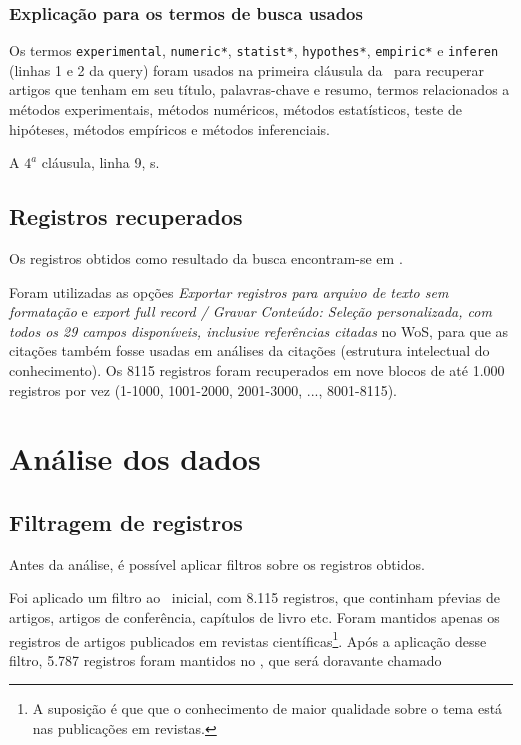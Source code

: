 \subsubsection{Explicação para os termos de busca usados\label{}}


Os termos \texttt{experimental}, \texttt{numeric*}, \texttt{statist*}, \texttt{hypothes*}, 
\texttt{empiric*}
e \texttt{inferen} (linhas 1 e 2 da query) foram usados na primeira cláusula da \query\  para recuperar artigos que tenham em seu título, palavras-chave e resumo, termos relacionados a métodos experimentais,
métodos numéricos,
métodos estatísticos,
teste de hipóteses,
métodos empíricos e métodos inferenciais.


A $4^{a}$ cláusula, linha 9,  s.

\subsection{Registros recuperados}

Os  registros obtidos como resultado da busca encontram-se em \url{}. 

Foram utilizadas as opções \textit{Exportar registros para arquivo de texto sem formatação} e \textit{export full record / Gravar Conteúdo: Seleção personalizada, com todos os 29 campos disponíveis, inclusive referências citadas} no WoS, para que as citações também fosse usadas em análises da citações (estrutura intelectual do conhecimento). Os 8115 registros foram recuperados em nove blocos de até 1.000 registros por vez (1-1000, 1001-2000, 2001-3000, ..., 8001-8115).


\section{Análise dos dados}

\subsection{Filtragem de registros}
Antes da análise, é possível aplicar filtros sobre os registros obtidos.

Foi aplicado um filtro ao \dataset\   inicial, com 8.115 registros, que continham pŕevias de artigos, artigos de conferência, capítulos de livro etc. Foram mantidos apenas os registros de artigos publicados em revistas científicas\footnote{A suposição é que que o conhecimento de maior qualidade sobre o tema está nas publicações em revistas.}. Após a aplicação desse filtro, 5.787 registros foram mantidos no \dataset, que será doravante chamado

